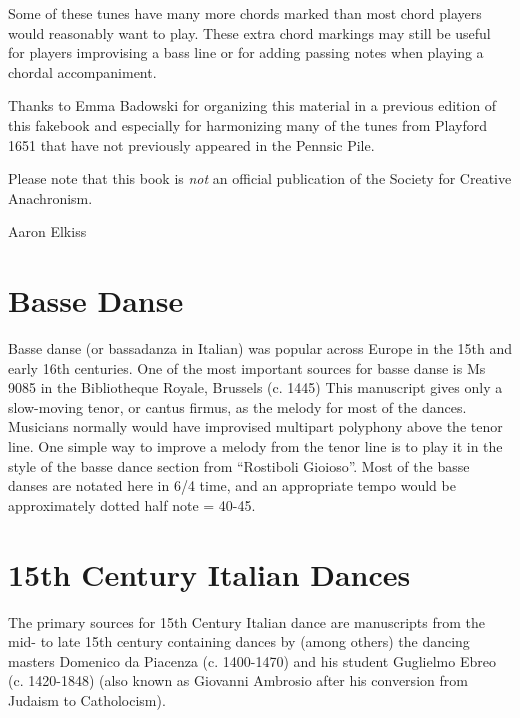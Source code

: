 \documentclass[11pt]{book}
\begin{document}
Some of these tunes have many more chords marked than most chord players would
reasonably want to play. These extra chord markings may still be useful for
players improvising a bass line or for adding passing notes when playing a
chordal accompaniment.

Thanks to Emma Badowski for organizing this material in a previous edition of
this fakebook and especially for harmonizing many of the tunes from Playford
1651 that have not previously appeared in the Pennsic Pile.

Please note that this book is {\em not} an official publication of the Society
for Creative Anachronism.

Aaron Elkiss

\clearpage
\begin{multicols}{2}

\renewcommand\cftchapafterpnum{\vskip\baselineskip}
\setlength{\cftsubsecindent}{0pt}
\setlength{\cftsubsecnumwidth}{0pt}
\tableofcontents
\end{multicols}

\clearpage
\mainmatter

\chapter{Basse Danse}

Basse danse (or bassadanza in Italian) was popular across Europe in the 15th
and early 16th centuries. One of the most important sources for basse danse is
Ms 9085 in the Bibliotheque Royale, Brussels (c. 1445) This manuscript gives
only a slow-moving tenor, or cantus firmus, as the melody for most of the
dances. Musicians normally would have improvised multipart polyphony above the
tenor line. One simple way to improve a melody from the tenor line is to play
it in the style of the basse dance section from ``Rostiboli Gioioso''.  Most of
the basse danses are notated here in 6/4 time, and an appropriate tempo would
be approximately dotted half note = 40-45.

\clearpage



\chapter{15th Century Italian Dances}

The primary sources for 15th Century Italian dance are manuscripts from the
mid- to late 15th century containing dances by (among others) the dancing
masters Domenico da Piacenza (c. 1400-1470) and his student Guglielmo Ebreo (c.
1420-1848) (also known as Giovanni Ambrosio after his conversion from Judaism
to Catholocism).
\end{document}

